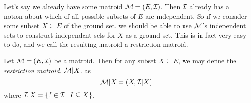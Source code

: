 \documentclass[12pt,oneside]{../../sfsuthesis}
\begin{document}
Let's say we already have some matroid \( \mathcal{M} = (E, \mathcal{I}) \).
Then \( \mathcal{I} \) already has a notion about which of all possible subsets of \( E \) are independent.
So if we consider some subset \( X \subseteq E \) of the ground set, we should be able to use \( \mathcal{M} \)'s independent sets to construct independent sets for \( X \) as a ground set.
This is in fact very easy to do, and we call the resulting matroid a restriction matroid.

\begin{definition}\th\label{def:restrictionMatroid}
    Let \( \mathcal{M} = (E, \mathcal{I}) \) be a matroid.
    Then for any subset \( X \subseteq E \), we may define the \emph{restriction matroid}, \( \mathcal{M}|X \), as
    \[
        \mathcal{M}|X = ( X, \mathcal{I}|X )
    \]
    where \( \mathcal{I}|X = \{I \in \mathcal{I} \; | \; I \subseteq X\} \).
\end{definition}
\end{document}
